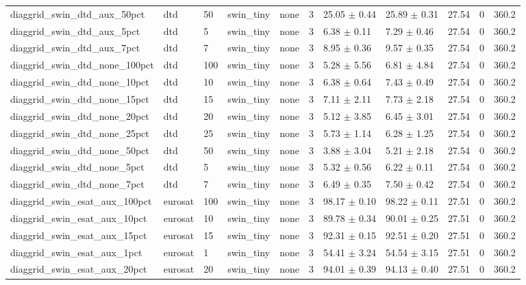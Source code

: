 \begin{tabular}{lllllllllll}
diaggrid_swin_dtd_aux_50pct & dtd & 50 & swin_tiny & none & 3 & 25.05 $\pm$ 0.44 & 25.89 $\pm$ 0.31 & 27.54 & 0 & 360.2 \\
diaggrid_swin_dtd_aux_5pct & dtd & 5 & swin_tiny & none & 3 & 6.38 $\pm$ 0.11 & 7.29 $\pm$ 0.46 & 27.54 & 0 & 360.2 \\
diaggrid_swin_dtd_aux_7pct & dtd & 7 & swin_tiny & none & 3 & 8.95 $\pm$ 0.36 & 9.57 $\pm$ 0.35 & 27.54 & 0 & 360.2 \\
diaggrid_swin_dtd_none_100pct & dtd & 100 & swin_tiny & none & 3 & 5.28 $\pm$ 5.56 & 6.81 $\pm$ 4.84 & 27.54 & 0 & 360.2 \\
diaggrid_swin_dtd_none_10pct & dtd & 10 & swin_tiny & none & 3 & 6.38 $\pm$ 0.64 & 7.43 $\pm$ 0.49 & 27.54 & 0 & 360.2 \\
diaggrid_swin_dtd_none_15pct & dtd & 15 & swin_tiny & none & 3 & 7.11 $\pm$ 2.11 & 7.73 $\pm$ 2.18 & 27.54 & 0 & 360.2 \\
diaggrid_swin_dtd_none_20pct & dtd & 20 & swin_tiny & none & 3 & 5.12 $\pm$ 3.85 & 6.45 $\pm$ 3.01 & 27.54 & 0 & 360.2 \\
diaggrid_swin_dtd_none_25pct & dtd & 25 & swin_tiny & none & 3 & 5.73 $\pm$ 1.14 & 6.28 $\pm$ 1.25 & 27.54 & 0 & 360.2 \\
diaggrid_swin_dtd_none_50pct & dtd & 50 & swin_tiny & none & 3 & 3.88 $\pm$ 3.04 & 5.21 $\pm$ 2.18 & 27.54 & 0 & 360.2 \\
diaggrid_swin_dtd_none_5pct & dtd & 5 & swin_tiny & none & 3 & 5.32 $\pm$ 0.56 & 6.22 $\pm$ 0.11 & 27.54 & 0 & 360.2 \\
diaggrid_swin_dtd_none_7pct & dtd & 7 & swin_tiny & none & 3 & 6.49 $\pm$ 0.35 & 7.50 $\pm$ 0.42 & 27.54 & 0 & 360.2 \\
diaggrid_swin_esat_aux_100pct & eurosat & 100 & swin_tiny & none & 3 & 98.17 $\pm$ 0.10 & 98.22 $\pm$ 0.11 & 27.51 & 0 & 360.2 \\
diaggrid_swin_esat_aux_10pct & eurosat & 10 & swin_tiny & none & 3 & 89.78 $\pm$ 0.34 & 90.01 $\pm$ 0.25 & 27.51 & 0 & 360.2 \\
diaggrid_swin_esat_aux_15pct & eurosat & 15 & swin_tiny & none & 3 & 92.31 $\pm$ 0.15 & 92.51 $\pm$ 0.20 & 27.51 & 0 & 360.2 \\
diaggrid_swin_esat_aux_1pct & eurosat & 1 & swin_tiny & none & 3 & 54.41 $\pm$ 3.24 & 54.54 $\pm$ 3.15 & 27.51 & 0 & 360.2 \\
diaggrid_swin_esat_aux_20pct & eurosat & 20 & swin_tiny & none & 3 & 94.01 $\pm$ 0.39 & 94.13 $\pm$ 0.40 & 27.51 & 0 & 360.2 \\

\end{tabular}
